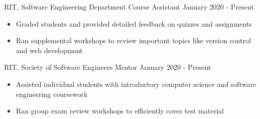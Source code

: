 \documentclass{awesome-cv}
\begin{document}
\begin{cventries}
		
		\end{cventries}
	\vspace{-0.1cm}
		\begin{cventries}
			\vspace{-0.1cm}
			
			\cventry
				{RIT, Software Engineering Department}
				{Course Assistant\small{\textnormal{\color{graytext}{, Introduction to Software Engineering}}}}
				{January 2020 - Present}
				{}
				{
					\vspace{-0.3cm}
					\begin{itemize}[nosep]
						\item Graded students and provided detailed feedback on quizzes and assignments
						\item Ran supplemental workshops to review important topics like version control and web development
					\end{itemize}
					\vspace{-0.5cm}
				}
				
			\cventry
				{RIT, Society of Software Engineers}
				{Mentor}
				{January 2020 - Present}
				{}
				{
					\vspace{-0.3cm}
					\begin{itemize}[nosep]
						\item Assisted individual students with introductory computer science and software engineering coursework
						\item Ran group exam review workshops to efficiently cover test material
					\end{itemize}
					\vspace{-0.5cm}
				}	
		\end{cventries}
\end{document}
